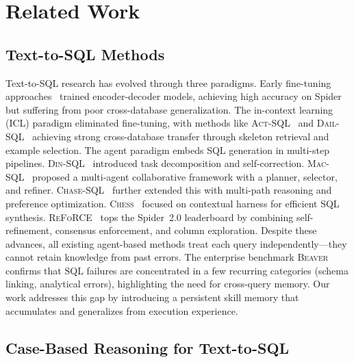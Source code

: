 \section{Related Work}
\label{sec:related_work}

\subsection{Text-to-SQL Methods}
\label{subsec:text2sql}

Text-to-SQL research has evolved through three paradigms. 
Early fine-tuning approaches~\cite{yu2018spider} trained encoder-decoder models, achieving high accuracy on Spider but suffering from poor cross-database generalization. 
The in-context learning (ICL) paradigm eliminated fine-tuning, with methods like \textsc{Act-SQL}~\cite{actsql2023} and \textsc{Dail-SQL}~\cite{gao2024dail} achieving strong cross-database transfer through skeleton retrieval and example selection. 
The agent paradigm embeds SQL generation in multi-step pipelines.
\textsc{Din-SQL}~\cite{pourreza2023din} introduced task decomposition and self-correction. \textsc{Mac-SQL}~\cite{wang2025macsql} proposed a multi-agent collaborative framework with a planner, selector, and refiner. 
\textsc{Chase-SQL}~\cite{chasesql2024} further extended this with multi-path reasoning and preference optimization. \textsc{Chess}~\cite{talaei2024chess} focused on contextual harness for efficient SQL synthesis.
\textsc{ReFoRCE}~\cite{reforce2025} tops the Spider~2.0 leaderboard by combining self-refinement, consensus enforcement, and column exploration. Despite these advances, all existing agent-based methods treat each query independently---they cannot retain knowledge from past errors.
The enterprise benchmark \textsc{Beaver}~\cite{chen2024beaver} confirms that SQL failures are concentrated in a few recurring categories (schema linking, analytical errors), highlighting the need for cross-query memory. 
Our work addresses this gap by introducing a persistent skill memory that accumulates and generalizes from execution experience.

\subsection{Case-Based Reasoning for Text-to-SQL}
\label{subsec:cbr}

